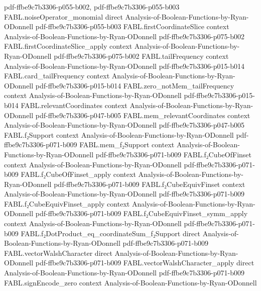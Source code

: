 \begin{theorem}
  {pdf-ffbe9c7b3306-p055-b002,
    pdf-ffbe9c7b3306-p055-b003}
\proofstep
  {FABL.noiseOperator_monomial}
  {direct}
  {Analysis-of-Boolean-Functions-by-Ryan-ODonnell}
  {pdf-ffbe9c7b3306-p055-b003}
\proofstep
  {FABL.firstCoordinateSlice}
  {context}
  {Analysis-of-Boolean-Functions-by-Ryan-ODonnell}
  {pdf-ffbe9c7b3306-p075-b002}
\proofstep
  {FABL.firstCoordinateSlice_apply}
  {context}
  {Analysis-of-Boolean-Functions-by-Ryan-ODonnell}
  {pdf-ffbe9c7b3306-p075-b002}
\proofstep
  {FABL.tailFrequency}
  {context}
  {Analysis-of-Boolean-Functions-by-Ryan-ODonnell}
  {pdf-ffbe9c7b3306-p015-b014}
\proofstep
  {FABL.card_tailFrequency}
  {context}
  {Analysis-of-Boolean-Functions-by-Ryan-ODonnell}
  {pdf-ffbe9c7b3306-p015-b014}
\proofstep
  {FABL.zero_notMem_tailFrequency}
  {context}
  {Analysis-of-Boolean-Functions-by-Ryan-ODonnell}
  {pdf-ffbe9c7b3306-p015-b014}
\proofstep
  {FABL.relevantCoordinates}
  {context}
  {Analysis-of-Boolean-Functions-by-Ryan-ODonnell}
  {pdf-ffbe9c7b3306-p047-b005}
\proofstep
  {FABL.mem_relevantCoordinates}
  {context}
  {Analysis-of-Boolean-Functions-by-Ryan-ODonnell}
  {pdf-ffbe9c7b3306-p047-b005}
\proofstep
  {FABL.f₂Support}
  {context}
  {Analysis-of-Boolean-Functions-by-Ryan-ODonnell}
  {pdf-ffbe9c7b3306-p071-b009}
\proofstep
  {FABL.mem_f₂Support}
  {context}
  {Analysis-of-Boolean-Functions-by-Ryan-ODonnell}
  {pdf-ffbe9c7b3306-p071-b009}
\proofstep
  {FABL.f₂CubeOfFinset}
  {context}
  {Analysis-of-Boolean-Functions-by-Ryan-ODonnell}
  {pdf-ffbe9c7b3306-p071-b009}
\proofstep
  {FABL.f₂CubeOfFinset_apply}
  {context}
  {Analysis-of-Boolean-Functions-by-Ryan-ODonnell}
  {pdf-ffbe9c7b3306-p071-b009}
\proofstep
  {FABL.f₂CubeEquivFinset}
  {context}
  {Analysis-of-Boolean-Functions-by-Ryan-ODonnell}
  {pdf-ffbe9c7b3306-p071-b009}
\proofstep
  {FABL.f₂CubeEquivFinset_apply}
  {context}
  {Analysis-of-Boolean-Functions-by-Ryan-ODonnell}
  {pdf-ffbe9c7b3306-p071-b009}
\proofstep
  {FABL.f₂CubeEquivFinset_symm_apply}
  {context}
  {Analysis-of-Boolean-Functions-by-Ryan-ODonnell}
  {pdf-ffbe9c7b3306-p071-b009}
\proofstep
  {FABL.f₂DotProduct_eq_coordinateSum_f₂Support}
  {direct}
  {Analysis-of-Boolean-Functions-by-Ryan-ODonnell}
  {pdf-ffbe9c7b3306-p071-b009}
\proofstep
  {FABL.vectorWalshCharacter}
  {direct}
  {Analysis-of-Boolean-Functions-by-Ryan-ODonnell}
  {pdf-ffbe9c7b3306-p071-b009}
\proofstep
  {FABL.vectorWalshCharacter_apply}
  {direct}
  {Analysis-of-Boolean-Functions-by-Ryan-ODonnell}
  {pdf-ffbe9c7b3306-p071-b009}
\proofstep
  {FABL.signEncode_zero}
  {context}
  {Analysis-of-Boolean-Functions-by-Ryan-ODonnell}

\end{theorem}

